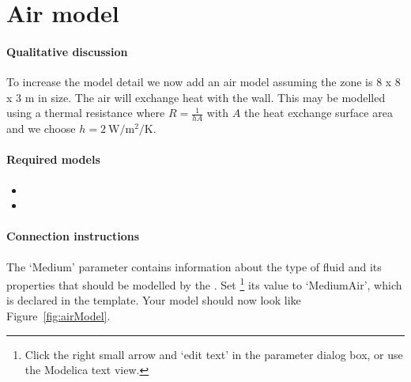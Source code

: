 \documentclass[10pt,a4paper]{article}
\begin{document}
\section{Air model}
\paragraph{Qualitative discussion}
To increase the model detail we now add
an air model assuming the zone is 8 x 8 x 3 m in size.
The air will exchange heat with the wall.
This may be modelled using a thermal resistance 
where $R=\frac{1}{hA}$ with $A$ the heat exchange 
surface area and we choose $h=\SI{2}{\watt\per\square\meter\per\kelvin}$.


\paragraph{Required models}
\begin{itemize}
\item {}
\item {}
\end{itemize}

\paragraph{Connection instructions}
The  `Medium' parameter contains
information about the type of fluid and its properties
that should be modelled by the .
Set
\footnote{Click the right small arrow and `edit text' in the parameter dialog box, or use the Modelica text view.}
 its value to `MediumAir', which is declared in the template. Your model should now look like Figure~\ref{fig:airModel}.
 
\end{document}
